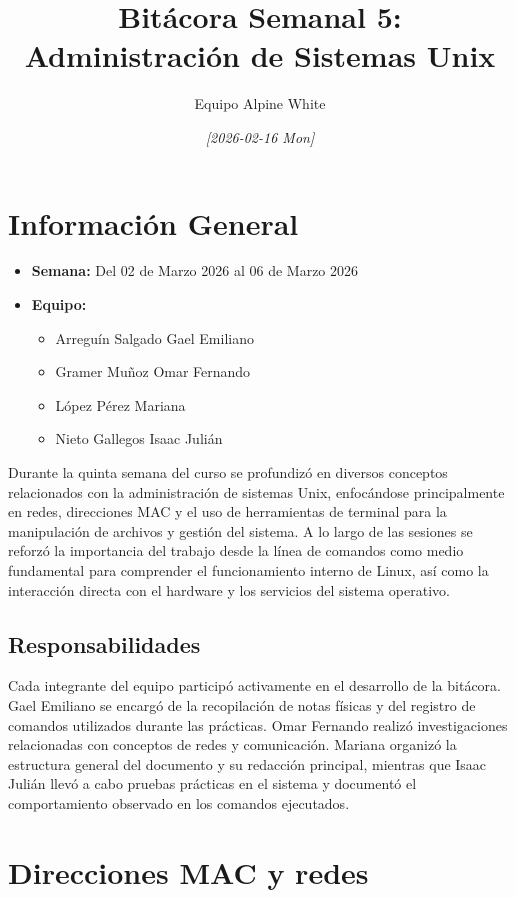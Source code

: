 \documentclass[11pt, letterpaper]{article}
\author{Equipo Alpine White}
\date{\textit{{[}2026-02-16 Mon]}}
\title{Bitácora Semanal 5: Administración de Sistemas Unix}
\begin{document}
\maketitle
\setcounter{tocdepth}{2}
\tableofcontents

\section{Información General}
\label{sec:org86b3dca}

\begin{itemize}
\item \textbf{Semana:} Del 02 de Marzo 2026 al 06 de Marzo 2026
\item \textbf{Equipo:}
\begin{itemize}
\item Arreguín Salgado Gael Emiliano
\item Gramer Muñoz Omar Fernando
\item López Pérez Mariana
\item Nieto Gallegos Isaac Julián
\end{itemize}
\end{itemize}

Durante la quinta semana del curso se profundizó en diversos conceptos
relacionados con la administración de sistemas Unix, enfocándose
principalmente en redes, direcciones MAC y el uso de herramientas de
terminal para la manipulación de archivos y gestión del sistema. A lo
largo de las sesiones se reforzó la importancia del trabajo desde la
línea de comandos como medio fundamental para comprender el
funcionamiento interno de Linux, así como la interacción directa con
el hardware y los servicios del sistema operativo.
\subsection{Responsabilidades}
\label{sec:org0e03621}

Cada integrante del equipo participó activamente en el desarrollo de la
bitácora. Gael Emiliano se encargó de la recopilación de notas físicas
y del registro de comandos utilizados durante las prácticas. Omar
Fernando realizó investigaciones relacionadas con conceptos de redes y
comunicación. Mariana organizó la estructura general del documento y
su redacción principal, mientras que Isaac Julián llevó a cabo pruebas
prácticas en el sistema y documentó el comportamiento observado en los
comandos ejecutados.
\section{Direcciones MAC y redes}
\label{sec:orge8c8588}
\end{document}
